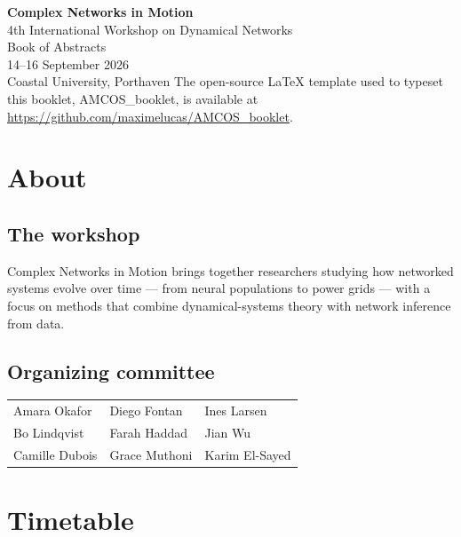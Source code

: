 \documentclass[openany, parskip=full, 12pt, a4paper]{scrbook}
\begin{document}
\begin{titlepage}
\centering
\vspace*{3cm}
{\Huge \bfseries \textcolor{myblue}{Complex Networks in Motion}}\\[1em]
{\Large 4th International Workshop on Dynamical Networks}\\[2em]
{\large Book of Abstracts}\\[3em]
{\large 14--16 September 2026 \\ Coastal University, Porthaven}
\vfill
{\small The open-source \LaTeX{} template used to typeset this booklet,
AMCOS\_booklet, is available at
\url{https://github.com/maximelucas/AMCOS_booklet}.}
\end{titlepage}

\tableofcontents

\chapter{About}

\section{The workshop}
Complex Networks in Motion brings together researchers studying how
networked systems evolve over time — from neural populations to power
grids — with a focus on methods that combine dynamical-systems theory
with network inference from data.

\section{Organizing committee}
\begin{center}
\begin{tabular}{lll}
Amara Okafor & Diego Fontan & Ines Larsen \\
Bo Lindqvist & Farah Haddad & Jian Wu \\
Camille Dubois & Grace Muthoni & Karim El-Sayed
\end{tabular}
\end{center}

\chapter{Timetable}
\end{document}
